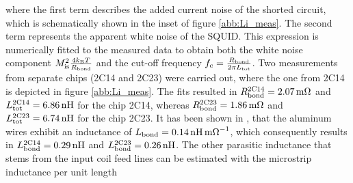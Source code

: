 
where the first term describes the added current noise of the shorted circuit, which is schematically shown in the inset of figure \ref{abb:Li_meas}. The second term represents the apparent white noise of the SQUID. This expression is numerically fitted to the measured data to obtain both the white noise component $ M_{\rm is}^2\frac{4k_{\rm B}T}{R_{\rm bond}}$ and the cut-off frequency $f_{\rm c}=\frac{R_{\rm bond}}{2\pi L_{\rm tot}}$. Two measurements from separate chips (2C14 and 2C23) were carried out, where the one from 2C14 is depicted in figure \ref{abb:Li_meas}. The fits resulted in $R_{\rm bond}^{\rm 2C14}=\qty{2.07}{\milli\ohm}$ and $L_{\rm tot}^{\rm 2C14}=\qty{6.86}{\nH}$ for the chip 2C14, whereas $R_{\rm bond}^{\rm 2C23}=\qty{1.86}{\milli\ohm}$ and $L_{\rm tot}^{\rm 2C23}=\qty{6.74}{\nH}$ for the chip 2C23. It has been shown in \cite{Hengstler2017}, that the aluminum wires exhibit an inductance of $L_{\rm bond}=\qty{0.14}{\nano\henry\per\milli\ohm}$, which consequently results in $L_{\rm bond}^{\rm 2C14}=\qty{0.29}{\nH}$ and  $L_{\rm bond}^{\rm 2C23}=\qty{0.26}{\nH}$. The other parasitic inductance that stems from the input coil feed lines can be estimated with the microstrip inductance per unit length \cite{Chang1979}


